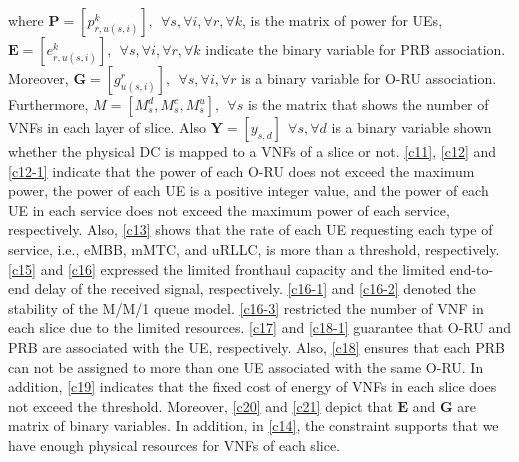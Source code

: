 \documentclass{article}
\begin{document}
\noindent where $\boldsymbol{P} =[p_{r,u(s,i)}^{k}], \:\: \forall s , \forall i, \forall r, \forall k $, is the matrix of power for UEs, $\boldsymbol{E} =[e_{r,u(s,i)}^k], \:\: \forall s , \forall i, \forall r, \forall k$ indicate the binary variable for PRB association. Moreover, $\boldsymbol{G} =[g_{u(s,i)}^r], \:\: \forall s , \forall i, \forall r$ is a binary variable for O-RU association. Furthermore, $M = [M_s^d, M_s^c, M_s^u], \:\: \forall s$ is the matrix that shows the number of VNFs in each layer of slice.
Also $\boldsymbol{Y} =[y_{s,d}]  \:\: \forall s ,  \forall d $ is a binary variable shown whether
the physical DC is mapped to a VNFs of a slice or not.
\eqref{c11}, \eqref{c12} and \eqref{c12-1} indicate that the power of each O-RU does not exceed the maximum power, the power of each UE is a positive integer value, and the power of each UE in each service does not exceed the maximum power of each service, respectively.  
Also, \eqref{c13} shows that the rate of each UE requesting each type of service, i.e., eMBB, mMTC, and uRLLC, is more than a threshold, respectively.
\eqref{c15} and \eqref{c16} expressed the limited fronthaul capacity and the limited end-to-end delay of the received signal, respectively.
\eqref{c16-1} and \eqref{c16-2} denoted the stability of the M/M/1 queue model.
\eqref{c16-3} restricted the number of VNF in each slice due to the limited resources.
\eqref{c17} and \eqref{c18-1} guarantee that O-RU and PRB are associated with the UE, respectively.
Also, \eqref{c18} ensures that each PRB can not be assigned to more than one UE associated with the same O-RU.
In addition, \eqref{c19} indicates that the fixed cost of energy of VNFs in each slice does not exceed the threshold. 
Moreover, \eqref{c20} and \eqref{c21} depict that $\boldsymbol{E}$ and $\boldsymbol{G}$ are matrix of binary variables.
In addition, in \eqref{c14}, the constraint supports that we have enough physical resources for VNFs of each slice.
\end{document}
